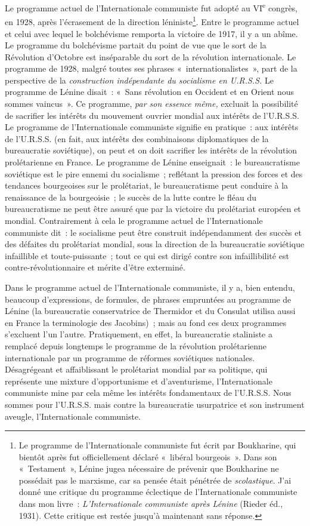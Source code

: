 \documentclass[french,twoside]{book} %
\begin{document}
Le programme actuel de l’Internationale communiste fut adopté au VI\textsuperscript{e} congrès, en 1928, après l’écrasement de la direction léniniste\footnote{ \noindent Le programme de l’Internationale communiste fut écrit par Boukharine, qui bientôt après fut officiellement déclaré « libéral bourgeois ». Dans son « Testament », Lénine jugea nécessaire de prévenir que Boukharine ne possédait pas le marxisme, car sa pensée était pénétrée de \emph{scolastique}. J’ai donné une critique du programme éclectique de l’Internationale communiste dans mon livre : \emph{L’Internationale communiste après Lénine} (Rieder éd., 1931). Cette critique est restée jusqu’à maintenant sans réponse.
 }. Entre le programme actuel et celui avec lequel le bolchévisme remporta la victoire de 1917, il y a un abîme. Le programme du bolchévisme partait du point de vue que le sort de la Révolution d’Octobre est inséparable du sort de la révolution internationale. Le programme de 1928, malgré toutes ses phrases « internationalistes », part de la perspective de la \emph{construction indépendante du socialisme en U.R.S.S.} Le programme de Lénine disait : « Sans révolution en Occident et en Orient nous sommes vaincus ». Ce programme, \emph{par son essence même,} excluait la possibilité de  sacrifier les intérêts du mouvement ouvrier mondial aux intérêts de l’U.R.S.S. Le programme de l’Internationale communiste signifie en pratique : aux intérêts de l’U.R.S.S. (en fait, aux intérêts des combinaisons diplomatiques de la bureaucratie soviétique), on peut et on doit sacrifier les intérêts de la révolution prolétarienne en France. Le programme de Lénine enseignait : le bureaucratisme soviétique est le pire ennemi du socialisme ; reflétant la pression des forces et des tendances bourgeoises sur le prolétariat, le bureaucratisme peut conduire à la renaissance de la bourgeoisie ; le succès de la lutte contre le fléau du bureaucratisme ne peut être assuré que par la victoire du prolétariat européen et mondial. Contrairement à cela le programme actuel de l’Internationale communiste dit : le socialisme peut être construit indépendamment des succès et des défaites du prolétariat mondial, sous la direction de la bureaucratie soviétique infaillible et toute-puissante ; tout ce qui est dirigé contre son infaillibilité est contre-révolutionnaire et mérite d’être exterminé.\par
Dans le programme actuel de l’Internationale communiste, il y a, bien entendu, beaucoup d’expressions, de formules, de phrases empruntées au programme de Lénine (la bureaucratie conservatrice de Thermidor et du Consulat utilisa aussi en France la terminologie des Jacobins) ; mais au fond ces deux programmes s’excluent l’un l’autre. Pratiquement, en effet, la bureaucratie staliniste a remplacé depuis longtemps le programme de la révolution prolétarienne internationale par un programme de réformes soviétiques nationales. Désagrégeant et affaiblissant le prolétariat mondial par sa politique, qui représente une mixture d’opportunisme et d’aventurisme, l’Internationale communiste mine par cela même les intérêts fondamentaux de l’U.R.S.S. Nous sommes pour l’U.R.S.S. mais contre la bureaucratie usurpatrice et son instrument aveugle, l’Internationale communiste.
\end{document}
